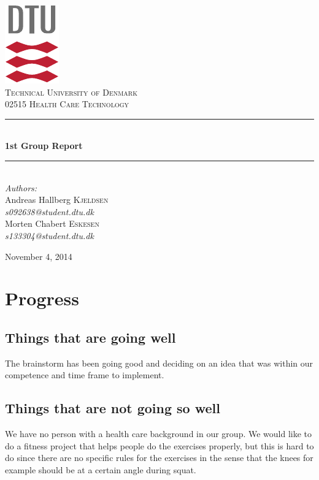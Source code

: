 \documentclass[12pt]{report}
\newcommand{\HRule}{\rule{\linewidth}{0.5mm}}
\begin{document}
\begin{titlepage}
\begin{center}

\includegraphics[scale=2.0]{../GFX/dtu_logo.pdf}\\[1cm]

\textsc{\LARGE Technical University of Denmark}\\[1.5cm]

\textsc{\Large 02515 Health Care Technology}\\[0.5cm]


\HRule \\[0.4cm]
{\huge \bfseries 1st Group Report}\\[0.1cm]
\HRule \\[1.5cm]

\large
\emph{Authors:}
\\[10pt]
Andreas Hallberg \textsc{Kjeldsen}\\
\emph{s092638@student.dtu.dk}
\\[10pt]
Morten Chabert \textsc{Eskesen}\\
\emph{s133304@student.dtu.dk}

\vfill

{\large November 4, 2014}

\end{center}
\end{titlepage}

\section*{Progress}
\subsection*{Things that are going well}
The brainstorm has been going good and deciding on an idea that was within our competence and time frame to implement.

\subsection*{Things that are not going so well}
We have no person with a health care background in our group. We would like to do a fitness project that helps people do the exercises properly, but this is hard to do since there are no specific rules for the exercises in the sense that the knees for example should be at a certain angle during squat.
\end{document}
